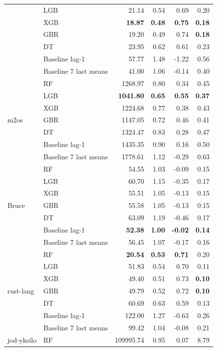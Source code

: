 \documentclass{article}
\begin{document}
\begin{longtable}{ll rrrr}
 & LGB & 21.14 & 0.54 & 0.69 & 0.20 \\
 & XGB & \textbf{18.87} & \textbf{0.48} & \textbf{0.75} & \textbf{0.18} \\
 & GBR & 19.20 & 0.49 & 0.74 & \textbf{0.18} \\
 & DT & 23.95 & 0.62 & 0.61 & 0.23 \\
 & Baseline lag-1 & 57.77 & 1.48 & -1.22 & 0.56 \\
 & Baseline 7 last means & 41.00 & 1.06 & -0.14 & 0.40 \\
\midrule
\multirow{7}{*}{m2os} & RF & 1268.97 & 0.80 & 0.34 & 0.45 \\
 & LGB & \textbf{1041.80} & \textbf{0.65} & \textbf{0.55} & \textbf{0.37} \\
 & XGB & 1224.68 & 0.77 & 0.38 & 0.43 \\
 & GBR & 1147.05 & 0.72 & 0.46 & 0.41 \\
 & DT & 1324.47 & 0.83 & 0.28 & 0.47 \\
 & Baseline lag-1 & 1435.35 & 0.90 & 0.16 & 0.50 \\
 & Baseline 7 last means & 1778.61 & 1.12 & -0.29 & 0.63 \\
\midrule
\multirow{7}{*}{Bruce} & RF & 54.55 & 1.03 & -0.09 & 0.15 \\
 & LGB & 60.70 & 1.15 & -0.35 & 0.17 \\
 & XGB & 55.51 & 1.05 & -0.13 & 0.15 \\
 & GBR & 55.58 & 1.05 & -0.13 & 0.15 \\
 & DT & 63.09 & 1.19 & -0.46 & 0.17 \\
 & Baseline lag-1 & \textbf{52.38} & \textbf{1.00} & \textbf{-0.02} & \textbf{0.14} \\
 & Baseline 7 last means & 56.45 & 1.07 & -0.17 & 0.16 \\
\midrule
\multirow{7}{*}{rust-lang} & RF & \textbf{20.54} & \textbf{0.53} & \textbf{0.71} & 0.20 \\
 & LGB & 51.83 & 0.54 & 0.70 & 0.11 \\
 & XGB & 49.40 & 0.51 & 0.73 & \textbf{0.10} \\
 & GBR & 49.79 & 0.52 & 0.72 & \textbf{0.10} \\
 & DT & 60.69 & 0.63 & 0.59 & 0.13 \\
 & Baseline lag-1 & 122.00 & 1.27 & -0.63 & 0.26 \\
 & Baseline 7 last means & 99.42 & 1.04 & -0.08 & 0.21 \\
\midrule
\multirow{7}{*}{jod-yksilo} & RF & 109995.74 & 0.95 & 0.07 & 8.79 \\

\end{longtable}
\end{document}
